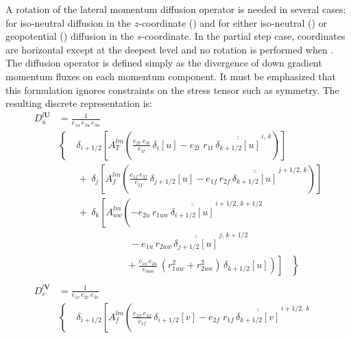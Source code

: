 \documentclass[../main/NEMO_manual]{subfiles}
\begin{document}
A rotation of the lateral momentum diffusion operator is needed in several cases:
for iso-neutral diffusion in the $z$-coordinate () and
for either iso-neutral () or
geopotential () diffusion in the $s$-coordinate.
In the partial step case, coordinates are horizontal except at the deepest level and
no rotation is performed when .
The diffusion operator is defined simply as the divergence of down gradient momentum fluxes on
each momentum component.
It must be emphasized that this formulation ignores constraints on the stress tensor such as symmetry.
The resulting discrete representation is:
\begin{equation}
  \label{eq:DYN_ldf_iso}
  \begin{split}
    D_u^{l\textbf{U}} &= \frac{1}{e_{1u} \, e_{2u} \, e_{3u} }	\\
    &  \left\{\quad  {\delta_{i+1/2} \left[ {A_T^{lm}  \left(
              {\frac{e_{2t} \; e_{3t} }{e_{1t} } \,\delta_{i}[u]
                -e_{2t} \; r_{1t} \,\overline{\overline {\delta_{k+1/2}[u]}}^{\,i,\,k}}
            \right)} \right]} 	\right. \\
    & \qquad +\ \delta_j \left[ {A_f^{lm} \left( {\frac{e_{1f}\,e_{3f} }{e_{2f}
            }\,\delta_{j+1/2} [u] - e_{1f}\, r_{2f}
            \,\overline{\overline {\delta_{k+1/2} [u]}} ^{\,j+1/2,\,k}}
        \right)} \right] \\
    &\qquad +\ \delta_k \left[ {A_{uw}^{lm} \left( {-e_{2u} \, r_{1uw} \,\overline{\overline
              {\delta_{i+1/2} [u]}}^{\,i+1/2,\,k+1/2} }
        \right.} \right. \\
    &  \ \qquad \qquad \qquad \quad\
    - e_{1u} \, r_{2uw} \,\overline{\overline {\delta_{j+1/2} [u]}} ^{\,j,\,k+1/2} \\
    & \left. {\left. { \ \qquad \qquad \qquad \ \ \ \left. {\
                +\frac{e_{1u}\, e_{2u} }{e_{3uw} }\,\left( {r_{1uw}^2+r_{2uw}^2}
                \right)\,\delta_{k+1/2} [u]} \right)} \right]\;\;\;} \right\} \\ \\
    D_v^{l\textbf{V}} &= \frac{1}{e_{1v} \, e_{2v} \, e_{3v} } \\
    &  \left\{\quad  {\delta_{i+1/2} \left[ {A_f^{lm}  \left(
              {\frac{e_{2f} \; e_{3f} }{e_{1f} } \,\delta_{i+1/2}[v]
                -e_{2f} \; r_{1f} \,\overline{\overline {\delta_{k+1/2}[v]}}^{\,i+1/2,\,k}}
}}
\end{split}
\end{equation}
\end{document}
